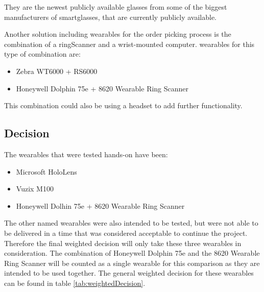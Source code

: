 They are the newest publicly available glasses from some of the biggest manufacturers of \gls{smartglasses}, that are currently publicly available.

Another solution including wearables for the order picking process is the combination of a \gls{ringScanner} and a wrist-mounted computer. \Gls{wearable}s for this type of combination are:

\begin{itemize}
	\item Zebra WT6000 + RS6000
	\item Honeywell Dolphin 75e + 8620 Wearable Ring Scanner
\end{itemize}

This combination could also be using a headset to add further functionality.

\subsection{Decision}

The wearables that were tested hands-on have been:
\begin{itemize}
	\item Microsoft HoloLens
	\item Vuzix M100
	\item Honeywell Dolhin 75e + 8620 Wearable Ring Scanner
\end{itemize}

The other named wearables were also intended to be tested, but were not able to be delivered in a time that was considered acceptable to continue the project. Therefore the final weighted decision will only take these three wearables in consideration. The combination of Honeywell Dolphin 75e and the 8620 Wearable Ring Scanner will be counted as a single wearable for this comparison as they are intended to be used together. The general weighted decision for these wearables can be found in table \ref{tab:weightedDecision}. 

